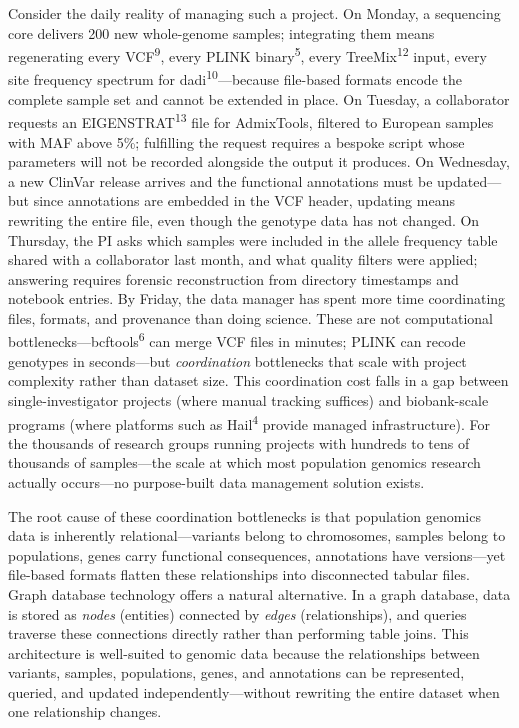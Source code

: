 \documentclass[11pt,a4paper]{article}
\newcommand{\citenum}[1]{\textsuperscript{#1}}
\begin{document}
Consider the daily reality of managing such a project. On Monday, a sequencing core delivers 200 new whole-genome samples; integrating them means regenerating every VCF\citenum{9}, every PLINK binary\citenum{5}, every TreeMix\citenum{12} input, every site frequency spectrum for dadi\citenum{10}---because file-based formats encode the complete sample set and cannot be extended in place. On Tuesday, a collaborator requests an EIGENSTRAT\citenum{13} file for AdmixTools, filtered to European samples with MAF above 5\%; fulfilling the request requires a bespoke script whose parameters will not be recorded alongside the output it produces. On Wednesday, a new ClinVar release arrives and the functional annotations must be updated---but since annotations are embedded in the VCF header, updating means rewriting the entire file, even though the genotype data has not changed. On Thursday, the PI asks which samples were included in the allele frequency table shared with a collaborator last month, and what quality filters were applied; answering requires forensic reconstruction from directory timestamps and notebook entries. By Friday, the data manager has spent more time coordinating files, formats, and provenance than doing science. These are not computational bottlenecks---bcftools\citenum{6} can merge VCF files in minutes; PLINK can recode genotypes in seconds---but \textit{coordination} bottlenecks that scale with project complexity rather than dataset size. This coordination cost falls in a gap between single-investigator projects (where manual tracking suffices) and biobank-scale programs (where platforms such as Hail\citenum{4} provide managed infrastructure). For the thousands of research groups running projects with hundreds to tens of thousands of samples---the scale at which most population genomics research actually occurs---no purpose-built data management solution exists.

The root cause of these coordination bottlenecks is that population genomics data is inherently relational---variants belong to chromosomes, samples belong to populations, genes carry functional consequences, annotations have versions---yet file-based formats flatten these relationships into disconnected tabular files. Graph database technology offers a natural alternative. In a graph database, data is stored as \textit{nodes} (entities) connected by \textit{edges} (relationships), and queries traverse these connections directly rather than performing table joins. This architecture is well-suited to genomic data because the relationships between variants, samples, populations, genes, and annotations can be represented, queried, and updated independently---without rewriting the entire dataset when one relationship changes.
\end{document}

